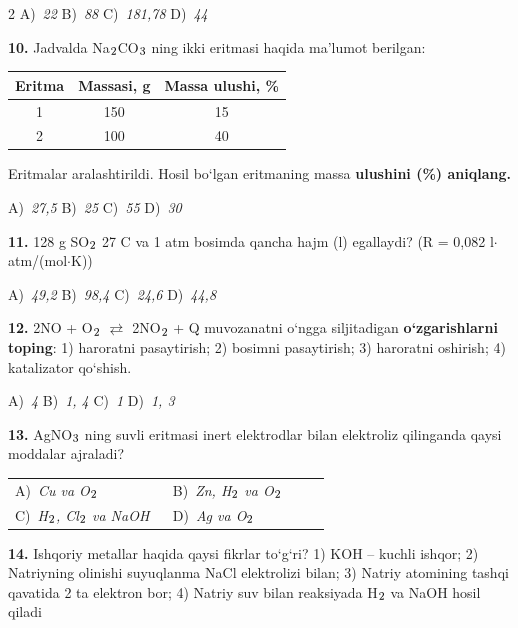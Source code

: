 \documentclass[11pt,a4paper]{article}
\renewcommand{\textsubscript}[1]{\ensuremath{_{\text{\fontsize{8}{8}\selectfont #1}}}}
\begin{document}
\begin{multicols}{2}
\noindent A)~\textsl{22} \hfill B)~\textsl{88} \hfill C)~\textsl{181,78} \hfill D)~\textsl{44}\par
\vspace{4pt}
\noindent\textbf{10.} Jadvalda Na\textsubscript{2}CO\textsubscript{3} ning ikki eritmasi haqida ma'lumot berilgan:
\begin{center}
\renewcommand{\arraystretch}{1.15}
\begin{tabular}{|c|c|c|}\hline
\textbf{Eritma} & \textbf{Massasi, g} & \textbf{Massa ulushi, \%} \\ \hline
1 & 150 & 15 \\ \hline
2 & 100 & 40 \\ \hline
\end{tabular}
\end{center}
Eritmalar aralashtirildi. Hosil bo`lgan eritmaning massa \textbf{ulushini (\%) aniqlang.}

\noindent A)~\textsl{27,5} \hfill B)~\textsl{25} \hfill C)~\textsl{55} \hfill D)~\textsl{30}\par
\vspace{4pt}
\noindent\textbf{11.} 128 g SO\textsubscript{2} 27 \textdegree{}C va 1 atm bosimda qancha hajm (l) egallaydi? (R = 0,082 l$\cdot$atm/(mol$\cdot$K))

\noindent A)~\textsl{49,2} \hfill B)~\textsl{98,4} \hfill C)~\textsl{24,6} \hfill D)~\textsl{44,8}\par
\vspace{4pt}
\noindent\textbf{12.} 2NO + O\textsubscript{2} $\rightleftarrows$ 2NO\textsubscript{2} + Q muvozanatni o`ngga siljitadigan \textbf{o`zgarishlarni toping}: 1) haroratni pasaytirish; 2) bosimni pasaytirish; 3) haroratni oshirish; 4) katalizator qo`shish.

\noindent A)~\textsl{4} \hfill B)~\textsl{1, 4} \hfill C)~\textsl{1} \hfill D)~\textsl{1, 3}\par
\vspace{4pt}
\noindent\textbf{13.} AgNO\textsubscript{3} ning suvli eritmasi inert elektrodlar bilan elektroliz qilinganda qaysi moddalar ajraladi?

\noindent\begin{tabular}{@{}p{0.47\linewidth}@{}p{0.47\linewidth}@{}}
A)~\textsl{Cu va O\textsubscript{2}} & B)~\textsl{Zn, H\textsubscript{2} va O\textsubscript{2}} \\
C)~\textsl{H\textsubscript{2}, Cl\textsubscript{2} va NaOH} & D)~\textsl{Ag va O\textsubscript{2}} \\
\end{tabular}\par
\vspace{4pt}
\noindent\textbf{14.} Ishqoriy metallar haqida qaysi fikrlar to`g`ri? 1) KOH -- kuchli ishqor; 2) Natriyning olinishi suyuqlanma NaCl elektrolizi bilan; 3) Natriy atomining tashqi qavatida 2 ta elektron bor; 4) Natriy suv bilan reaksiyada H\textsubscript{2} va NaOH hosil qiladi


\end{multicols}
\end{document}
